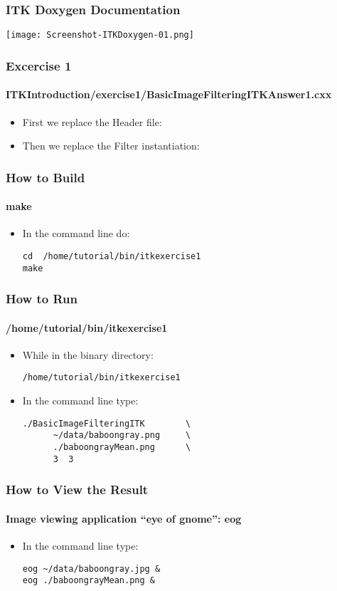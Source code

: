 \begin{frame}[fragile]
\frametitle{ITK Doxygen Documentation}
\begin{center}
  \texttt{[image: Screenshot-ITKDoxygen-01.png]}
\end{center}
\end{frame}

\begin{frame}
\frametitle{Excercise 1}
\framesubtitle{ITKIntroduction/exercise1/BasicImageFilteringITKAnswer1.cxx}
\begin{itemize}
\item First we replace the Header file:
\end{itemize}
\begin{itemize}
\item Then we replace the Filter instantiation:
\end{itemize}
\end{frame}

\begin{frame}[fragile]
\frametitle{How to Build}
\framesubtitle{make}
\begin{itemize}
\item In the command line do:
\begin{verbatim}
cd  /home/tutorial/bin/itkexercise1
make
\end{verbatim}
\end{itemize}
\end{frame}

\begin{frame}[fragile]
\frametitle{How to Run}
\framesubtitle{/home/tutorial/bin/itkexercise1}
\begin{itemize}
\item While in the binary directory:
\begin{verbatim}
/home/tutorial/bin/itkexercise1
\end{verbatim}
\item In the command line type:
\begin{verbatim}
./BasicImageFilteringITK        \
      ~/data/baboongray.png     \
      ./baboongrayMean.png      \
      3  3
\end{verbatim}
\end{itemize}
\end{frame}

\begin{frame}[fragile]
\frametitle{How to View the Result}
\framesubtitle{Image viewing application ``eye of gnome'': eog}
\begin{itemize}
\item In the command line type:
\begin{verbatim}
eog ~/data/baboongray.jpg &
eog ./baboongrayMean.png &
\end{verbatim}
\end{itemize}
\end{frame}

